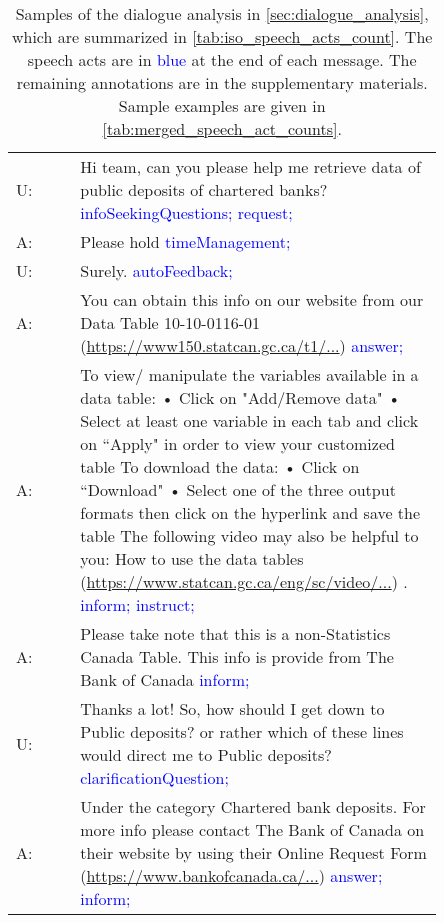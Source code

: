 \documentclass[11pt]{article}
\begin{document}
\begin{table}[h]
\begin{tabular}{l p{0.85\linewidth}}
U: &  Hi team, can you please help me retrieve data of public deposits of chartered banks? \textcolor{blue}{infoSeekingQuestions; request; }
\\ A: &  Please hold \textcolor{blue}{timeManagement; }
\\ U: &  Surely. \textcolor{blue}{autoFeedback; }
\\ A: &  You can obtain this info on our website from our Data Table 10-10-0116-01 (\href{https://www150.statcan.gc.ca/t1/tbl1/en/tv.action?pid=1010011601}{https://www150.statcan.gc.ca/t1/...}) \textcolor{blue}{answer;}
\\ A: &  To view/ manipulate the variables available in a data table: • Click on "Add/Remove data" • Select at least one variable in each tab and click on ``Apply" in order to view your customized table To download the data: • Click on ``Download" • Select one of the three output formats then click on the hyperlink and save the table The following video may also be helpful to you:  How to use the data tables (\href{https://www.statcan.gc.ca/eng/sc/video/howto}{https://www.statcan.gc.ca/eng/sc/video/...}) . \textcolor{blue}{inform; instruct; }
\\ A: &  Please take note that this is a non-Statistics Canada Table. This info is provide from The Bank of Canada \textcolor{blue}{inform; }
\\ U: &  Thanks a lot! So, how should I get down to Public deposits? or rather which of these lines would direct me to Public deposits? \textcolor{blue}{clarificationQuestion; }
\\ A: &  Under the category Chartered bank deposits. For more info please contact The Bank of Canada on their website by using their Online Request Form (\href{https://www.bankofcanada.ca/about/contact-information/general-inquiries/#online}{https://www.bankofcanada.ca/...}) \textcolor{blue}{answer; inform; }
\\
\bottomrule
\end{tabular}
    \caption{Samples of the dialogue analysis in \autoref{sec:dialogue_analysis}, which are summarized in \autoref{tab:iso_speech_acts_count}. The speech acts are in \textcolor{blue}{blue} at the end of each message. The remaining annotations are in the supplementary materials. Sample examples are given in \autoref{tab:merged_speech_act_counts}.}
    \label{tab:sample_linguistic_analysis}
\end{table}
\end{document}
